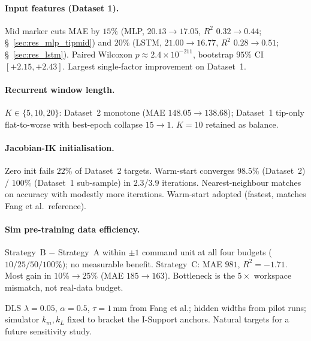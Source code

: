 \paragraph{Input features (Dataset 1).}
Mid marker cuts MAE by $15\%$ (MLP, $20.13 \to 17.05$, $R^{2}$ $0.32 \to 0.44$; §~\ref{sec:res_mlp_tipmid}) and $20\%$ (LSTM, $21.00 \to 16.77$, $R^{2}$ $0.28 \to 0.51$; §~\ref{sec:res_lstm}). Paired Wilcoxon $p \approx 2.4 \times 10^{-211}$, bootstrap $95\%$ CI $[+2.15, +2.43]$. Largest single-factor improvement on Dataset~1.

\paragraph{Recurrent window length.}
$K \in \{5, 10, 20\}$: Dataset~2 monotone (MAE $148.05 \to 138.68$); Dataset~1 tip-only flat-to-worse with best-epoch collapse $15 \to 1$. $K = 10$ retained as balance.

\paragraph{Jacobian-IK initialisation.}
Zero init fails $22\%$ of Dataset~2 targets. Warm-start converges $98.5\%$ (Dataset~2) / $100\%$ (Dataset~1 sub-sample) in $2.3$/$3.9$ iterations. Nearest-neighbour matches on accuracy with modestly more iterations. Warm-start adopted (fastest, matches Fang et al.\ reference).

\paragraph{Sim pre-training data efficiency.}
Strategy~B $-$ Strategy~A within $\pm 1$ command unit at all four budgets ($10/25/50/100\%$); no measurable benefit. Strategy~C: MAE $981$, $R^{2} = -1.71$. Most gain in $10\% \to 25\%$ (MAE $185 \to 163$). Bottleneck is the $5\times$ workspace mismatch, not real-data budget.

DLS $\lambda = 0.05$, $\alpha = 0.5$, $\tau = 1$\,mm from Fang et al.; hidden widths from pilot runs; simulator $k_m, k_L$ fixed to bracket the I-Support anchors. Natural targets for a future sensitivity study.
